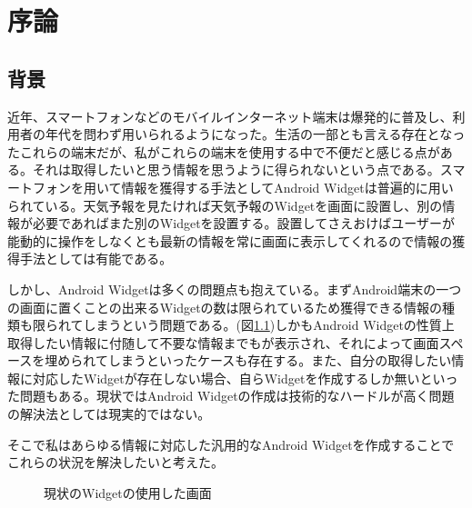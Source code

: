 \chapter{序論}
\label{chap:introduction}
\section{背景}


近年、スマートフォンなどのモバイルインターネット端末は爆発的に普及し、利用者の年代を問わず用いられるようになった。生活の一部とも言える存在となったこれらの端末だが、私がこれらの端末を使用する中で不便だと感じる点がある。それは取得したいと思う情報を思うように得られないという点である。スマートフォンを用いて情報を獲得する手法としてAndroid Widgetは普遍的に用いられている。天気予報を見たければ天気予報のWidgetを画面に設置し、別の情報が必要であればまた別のWidgetを設置する。設置してさえおけばユーザーが能動的に操作をしなくとも最新の情報を常に画面に表示してくれるので情報の獲得手法としては有能である。

しかし、Android Widgetは多くの問題点も抱えている。まずAndroid端末の一つの画面に置くことの出来るWidgetの数は限られているため獲得できる情報の種類も限られてしまうという問題である。(図\ref{fig:old_widget})しかもAndroid Widgetの性質上取得したい情報に付随して不要な情報までもが表示され、それによって画面スペースを埋められてしまうといったケースも存在する。また、自分の取得したい情報に対応したWidgetが存在しない場合、自らWidgetを作成するしか無いといった問題もある。現状ではAndroid Widgetの作成は技術的なハードルが高く問題の解決法としては現実的ではない。

そこで私はあらゆる情報に対応した汎用的なAndroid Widgetを作成することでこれらの状況を解決したいと考えた。

\begin{figure}[htbp]
  \begin{minipage}{0.5\hsize}
    \begin{center}
    \end{center}
    \caption{現状のWidgetの使用した画面}
    \label{fig:old_widget}
  \end{minipage}
\end{figure}

